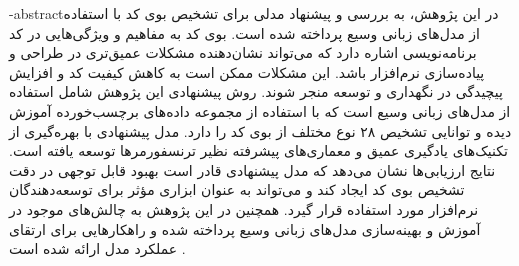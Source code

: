 \fa-abstract{در این پژوهش، به بررسی و پیشنهاد مدلی برای تشخیص بوی کد با استفاده از مدل‌های زبانی وسیع پرداخته شده است. بوی کد به مفاهیم و ویژگی‌هایی در کد برنامه‌نویسی اشاره دارد که می‌تواند نشان‌دهنده مشکلات عمیق‌تری در طراحی و پیاده‌سازی نرم‌افزار باشد. این مشکلات ممکن است به کاهش کیفیت کد و افزایش پیچیدگی در نگهداری و توسعه منجر شوند. روش پیشنهادی این پژوهش شامل استفاده از مدل‌های زبانی وسیع است که با استفاده از مجموعه داده‌های برچسب‌خورده آموزش دیده و توانایی تشخیص ۲۸ نوع مختلف از بوی کد را دارد. مدل پیشنهادی با بهره‌گیری از تکنیک‌های یادگیری عمیق و معماری‌های پیشرفته نظیر ترنسفورمرها توسعه یافته است. نتایج ارزیابی‌ها نشان می‌دهد که مدل پیشنهادی قادر است بهبود قابل توجهی در دقت تشخیص بوی کد ایجاد کند و می‌تواند به عنوان ابزاری مؤثر برای توسعه‌دهندگان نرم‌افزار مورد استفاده قرار گیرد. همچنین در این پژوهش به چالش‌های موجود در آموزش و بهینه‌سازی مدل‌های زبانی وسیع پرداخته شده و راهکارهایی برای ارتقای عملکرد مدل ارائه شده است .}

\abstractPage

\newpage\clearpage